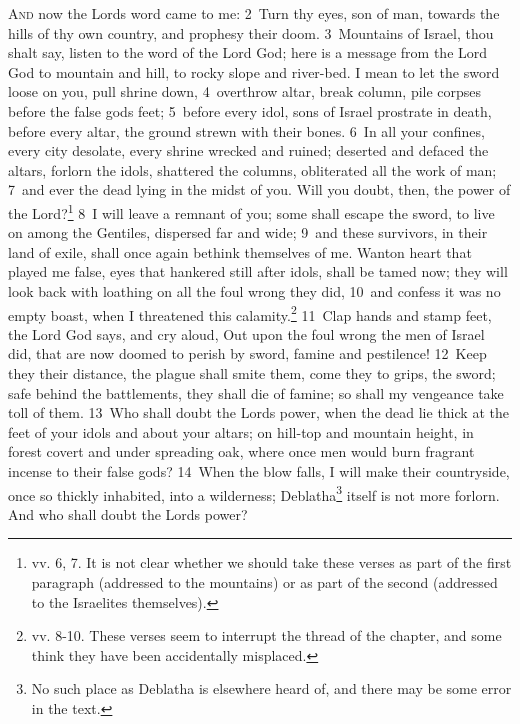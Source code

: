 \documentclass[10pt]{book} %
\begin{document}
\lettrine[lines=2]{A}{nd} now the Lord\textquotesingle s word came to me: \textcolor{benred8}{2}~Turn thy eyes, son of man, towards the hills of thy own country, and prophesy their doom. \textcolor{benred8}{3}~Mountains of Israel, thou shalt say, listen to the word of the Lord God; here is a message from the Lord God to mountain and hill, to rocky slope and river-bed. I mean to let the sword loose on you, pull shrine down, \textcolor{benred8}{4}~overthrow altar, break column, pile corpses before the false god\textquotesingle s feet; \textcolor{benred8}{5}~before every idol, sons of Israel prostrate in death, before every altar, the ground strewn with their bones. \textcolor{benred8}{6}~In all your confines, every city desolate, every shrine wrecked and ruined; deserted and defaced the altars, forlorn the idols, shattered the columns, obliterated all the work of man; \textcolor{benred8}{7}~and ever the dead lying in the midst of you. Will you doubt, then, the power of the Lord?\footnote[1]{vv. 6, 7. It is not clear whether we should take these verses as part of the first paragraph (addressed to the mountains) or as part of the second (addressed to the Israelites themselves).}
\textcolor{benred8}{8}~I will leave a remnant of you; some shall escape the sword, to live on among the Gentiles, dispersed far and wide; \textcolor{benred8}{9}~and these survivors, in their land of exile, shall once again bethink themselves of me. Wanton heart that played me false, eyes that hankered still after idols, shall be tamed now; they will look back with loathing on all the foul wrong they did, \textcolor{benred8}{10}~and confess it was no empty boast, when I threatened this calamity.\footnote[2]{vv. 8-10. These verses seem to interrupt the thread of the chapter, and some think they have been accidentally misplaced.}
\textcolor{benred8}{11}~Clap hands and stamp feet, the Lord God says, and cry aloud, Out upon the foul wrong the men of Israel did, that are now doomed to perish by sword, famine and pestilence! \textcolor{benred8}{12}~Keep they their distance, the plague shall smite them, come they to grips, the sword; safe behind the battlements, they shall die of famine; so shall my vengeance take toll of them. \textcolor{benred8}{13}~Who shall doubt the Lord\textquotesingle s power, when the dead lie thick at the feet of your idols and about your altars; on hill-top and mountain height, in forest covert and under spreading oak, where once men would burn fragrant incense to their false gods? \textcolor{benred8}{14}~When the blow falls, I will make their countryside, once so thickly inhabited, into a wilderness; Deblatha\footnote[3]{No such place as Deblatha is elsewhere heard of, and there may be some error in the text.} itself is not more forlorn. And who shall doubt the Lord\textquotesingle s power?
\end{document}

